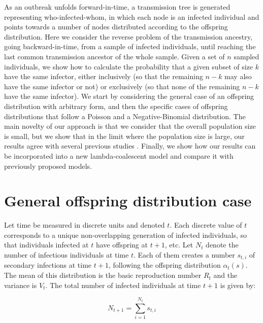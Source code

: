 \documentclass{article}
\begin{document}
As an outbreak unfolds forward-in-time, a transmission tree is generated representing who-infected-whom,
in which each node is an infected individual and points towards a number of nodes distributed according
to the offspring distribution. Here we consider the reverse problem of the transmission ancestry, going backward-in-time, from a sample of infected individuals, until reaching the last common 
transmission ancestor of the whole sample. Given a set of $n$ sampled individuals,
we show how to calculate the probability that a given subset of size $k$ have the same infector,
either inclusively (so that the remaining $n-k$ may also have the same infector or not)
or exclusively (so that none of the remaining $n-k$ have the same infector). We start
by considering the general case of an offspring distribution with arbitrary form, 
and then the specific cases of 
offspring distributions that follow a Poisson and a Negative-Binomial distribution.
The main novelty of our approach is that we consider that the overall population size is small,
but we show that in the limit where the population size is large, our results agree with several previous
studies \citep{Volz2012a,koelleRatesCoalescenceCommon2012,Fraser2017}.
Finally, we show how our results can be incorporated into a new lambda-coalescent model 
\citep{pitmanCoalescentsMultipleCollisions1999,sagitovGeneralCoalescentAsynchronous1999,
donnellyParticleRepresentationsMeasureValued1999} and compare it with previously
proposed models.

\section{General offspring distribution case}

Let time be measured in discrete units and denoted $t$. Each discrete value of $t$ corresponds to a unique non-overlapping 
generation of infected individuals, so that individuals infected at $t$ have offspring at $t+1$, etc. 
Let $N_t$ denote the number of infectious individuals at time $t$. Each of them creates a number $s_{t,i}$ of secondary infections at time $t+1$, following the offspring distribution $\alpha_t(s)$. The mean of this distribution is the basic reproduction number $R_t$ and the variance is $V_t$. The total number of infected individuals at time $t+1$ is given by:

\begin{equation}
N_{t+1}=\sum_{i=1}^{N_t} s_{t,i}
\label{eq:summation}
\end{equation}
\end{document}
